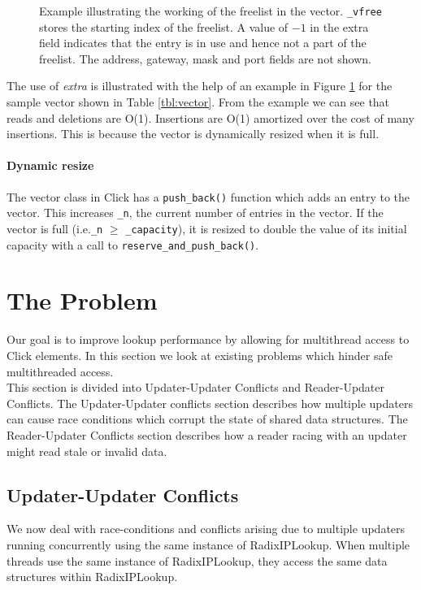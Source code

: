 \documentclass[a4paper,marginparwidth=50pt,marginparsep=10pt]{article}
\begin{document}
\begin{figure}[tph]
\begin{center}
\begin{tabular}{|p{2.5in} c|}
\hline
\end{tabular}
\cprotect\caption{Example illustrating the working of the freelist in the vector. \verb+_vfree+ stores the starting index of the freelist. A value of $-1$ in the extra field indicates that the entry is in use and hence not a part of the freelist. The address, gateway, mask and port fields are not shown.}
\end{center}
\label{fig:freelisteg}		
\end{figure}


The use of \emph{extra} is illustrated with the help of an example in Figure \ref{fig:freelisteg} for the sample vector shown in Table \ref{tbl:vector}. From the example we can see that reads and deletions are O(1). Insertions are O(1) amortized over the cost of many insertions. This is because the vector is dynamically resized when it is full.\\

\paragraph{Dynamic resize}
The vector class in Click has a \verb+push_back()+ function which adds an entry to the vector. This increases \verb$_n$, the current number of entries in the vector. If the vector is full (i.e.\verb+_n+ $\ge$ \verb+_capacity+), it is resized to double the value of its initial capacity with a call to \verb+reserve_and_push_back()+.

\section{The Problem}
\label{sec:problem}
Our goal is to improve lookup performance by allowing for multithread access to Click elements. In this section we look at existing problems which hinder safe multithreaded access.\\

This section is divided into Updater-Updater Conflicts and Reader-Updater Conflicts. The Updater-Updater conflicts section describes how multiple updaters can cause race conditions which corrupt the state of shared data structures. The Reader-Updater Conflicts section describes how a reader racing with an updater might read stale or invalid data.
\subsection{Updater-Updater Conflicts}
We now deal with race-conditions and conflicts arising due to multiple updaters running concurrently using the same instance of RadixIPLookup. When multiple threads use the same instance of RadixIPLookup, they access the same data structures within RadixIPLookup.
\end{document}
